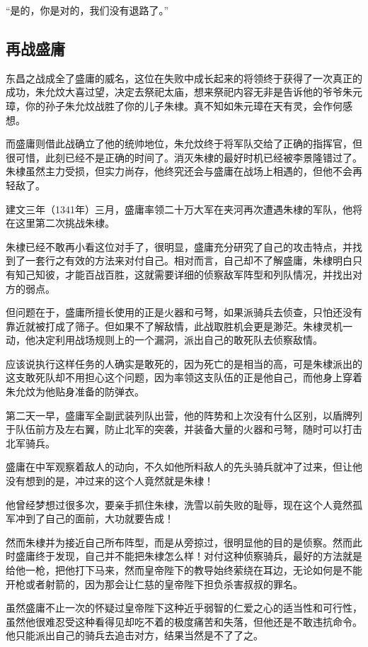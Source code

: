 \begin{multicols}{\theparacolNo}
		“是的，你是对的，我们没有退路了。”

		\subsection{再战盛庸}
		东昌之战成全了盛庸的威名，这位在失败中成长起来的将领终于获得了一次真正的成功，朱允炆大喜过望，决定去祭祀太庙，想来祭祀内容无非是告诉他的爷爷朱元璋，你的孙子朱允炆战胜了你的儿子朱棣。真不知如朱元璋在天有灵，会作何感想。

		而盛庸则借此战确立了他的统帅地位，朱允炆终于将军队交给了正确的指挥官，但很可惜，此刻已经不是正确的时间了。消灭朱棣的最好时机已经被李景隆错过了。朱棣虽然主力受损，但实力尚存，他终究还会与盛庸在战场上相遇的，但他不会再轻敌了。

		建文三年（1341年）三月，盛庸率领二十万大军在夹河再次遭遇朱棣的军队，他将在这里第二次挑战朱棣。

		朱棣已经不敢再小看这位对手了，很明显，盛庸充分研究了自己的攻击特点，并找到了一套行之有效的方法来对付自己。相对而言，自己却不了解盛庸，朱棣明白只有知己知彼，才能百战百胜，这就需要详细的侦察敌军阵型和列队情况，并找出对方的弱点。

		但问题在于，盛庸所擅长使用的正是火器和弓弩，如果派骑兵去侦查，只怕还没有靠近就被打成了筛子。但如果不了解敌情，此战取胜机会更是渺茫。朱棣灵机一动，他决定利用战场规则上的一个漏洞，派出自己的敢死队去侦察敌情。

		应该说执行这样任务的人确实是敢死的，因为死亡的是相当的高，可是朱棣派出的这支敢死队却不用担心这个问题，因为率领这支队伍的正是他自己，而他身上穿着朱允炆为他贴身准备的防弹衣。

		第二天一早，盛庸军全副武装列队出营，他的阵势和上次没有什么区别，以盾牌列于队伍前方及左右翼，防止北军的突袭，并装备大量的火器和弓弩，随时可以打击北军骑兵。

		盛庸在中军观察着敌人的动向，不久如他所料敌人的先头骑兵就冲了过来，但让他没有想到的是，冲过来的这个人竟然就是朱棣！

		他曾经梦想过很多次，要亲手抓住朱棣，洗雪以前失败的耻辱，现在这个人竟然孤军冲到了自己的面前，大功就要告成！

		然而朱棣并为接近自己所布阵型，而是从旁掠过，很明显他的目的是侦察。然而此时盛庸终于发现，自己并不能把朱棣怎么样！对付这种侦察骑兵，最好的方法就是给他一枪，把他打下马来，然而皇帝陛下的教导始终萦绕在耳边，无论如何是不能开枪或者射箭的，因为那会让仁慈的皇帝陛下担负杀害叔叔的罪名。

		虽然盛庸不止一次的怀疑过皇帝陛下这种近乎弱智的仁爱之心的适当性和可行性，虽然他很难忍受这种看得见却吃不着的极度痛苦和失落，但他还是不敢违抗命令。他只能派出自己的骑兵去追击对方，结果当然是不了了之。


\end{multicols}
